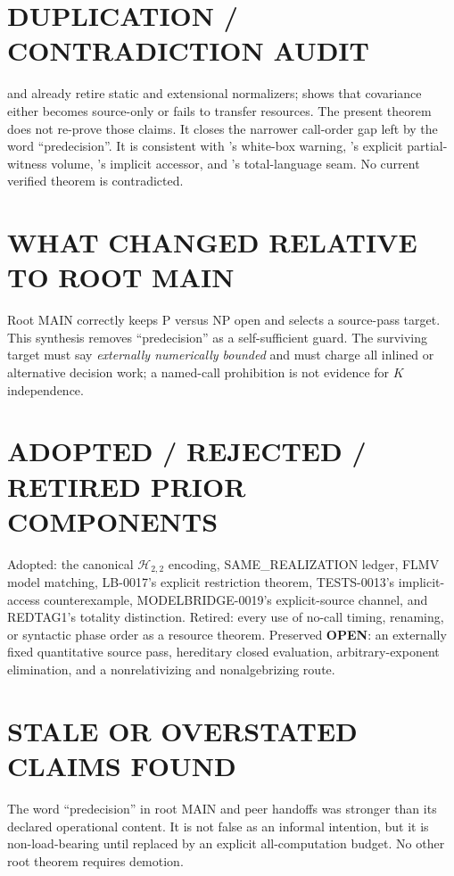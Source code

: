 \documentclass[11pt]{article}
\newcommand{\OPEN}{\textbf{OPEN}}
\begin{document}
\section{DUPLICATION / CONTRADICTION AUDIT}

 and  already retire static and extensional
normalizers;  shows that covariance either becomes source-only
or fails to transfer resources.  The present theorem does not re-prove those
claims.  It closes the narrower call-order gap left by the word
``predecision''.  It is consistent with 's white-box
warning, 's explicit partial-witness volume,
's implicit accessor, and 's total-language
seam.  No current verified theorem is contradicted.

\section{WHAT CHANGED RELATIVE TO ROOT MAIN}

Root MAIN correctly keeps P versus NP open and selects a source-pass target.
This synthesis removes ``predecision'' as a self-sufficient guard.  The
surviving target must say \emph{externally numerically bounded} and must
charge all inlined or alternative decision work; a named-call prohibition is
not evidence for $K$ independence.

\section{ADOPTED / REJECTED / RETIRED PRIOR COMPONENTS}

Adopted: the canonical $\mathcal H_{2,2}$ encoding, SAME\_REALIZATION ledger,
FLMV model matching, LB-0017's explicit restriction theorem, TESTS-0013's
implicit-access counterexample, MODELBRIDGE-0019's explicit-source channel,
and REDTAG1's totality distinction.  Retired: every use of no-call timing,
renaming, or syntactic phase order as a resource theorem.  Preserved
\OPEN: an externally fixed quantitative source pass, hereditary closed
evaluation, arbitrary-exponent elimination, and a nonrelativizing and
nonalgebrizing route.

\section{STALE OR OVERSTATED CLAIMS FOUND}

The word ``predecision'' in root MAIN and peer handoffs was stronger than its
declared operational content.  It is not false as an informal intention, but
it is non-load-bearing until replaced by an explicit all-computation budget.
No other root theorem requires demotion.
\end{document}
